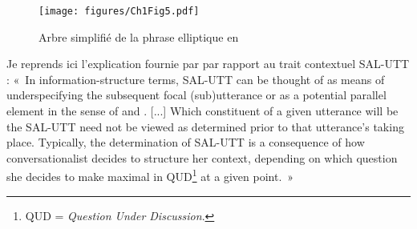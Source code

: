 \begin{figure} 
\texttt{[image: figures/Ch1Fig5.pdf]}

  

	


             

\caption{Arbre simplifié de la phrase elliptique en }
\label{ch1:fig5}
\end{figure}

Je reprends ici l’explication fournie par \citet[301]{GinzburgEtAl2000} par rapport au trait contextuel SAL-UTT : «~In information-structure terms, SAL-UTT can be thought of as means of underspecifying the subsequent focal (sub)utterance or as a potential parallel element in the sense of \citet{DalrympleEtAl1991} and \citet{Shieber1996}. [...] Which constituent of a given utterance will be the SAL-UTT need not be viewed as determined prior to that utterance’s taking place. Typically, the determination of SAL-UTT is a consequence of how conversationalist decides to structure her context, depending on which question she decides to make maximal in QUD\footnote{QUD = \textit{Question Under Discussion}.} at a given point.~» 

